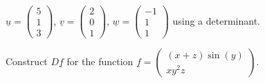 \documentclass[12pt,letterpaper,noanswers]{exam}
\newcommand{\mb}[1]{\underline{#1}}
\begin{document}
 \pdfpageheight 11in 
  \pdfpagewidth 8.5in



\begin{questions}
\item $\mb{u} = \left(\begin{array}{c}5 \\ 1\\ 3\end{array}\right)$, $\mb{v} =\left(\begin{array}{c}2 \\ 0\\ 1\end{array}\right)$, $\mb{w}=\left(\begin{array}{c} -1 \\ 1\\ 1\end{array}\right)$ using a determinant.

\vfill

\item Construct $D \mb{f}$ for the function $\displaystyle\mb{f} =  \left(\begin{array}{c}(x+z)\sin(y) \\ xy^2z \end{array}\right)$.
\vfill
\end{questions}
\end{document}
